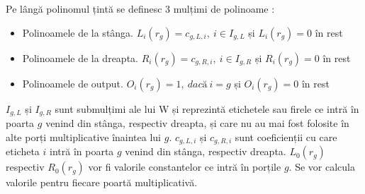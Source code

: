 Pe lângă polinomul țintă se definesc 3 mulțimi de polinoame \cite{ZKS_Crypto_Basic3}:
\begin{itemize}
    \item Polinoamele de la stânga. $L_i(r_g) = c_{g,L,i},\ i \in I_{g,L}$ și $L_i(r_g) = 0$ în rest
    \item Polinoamele de la dreapta. $R_i(r_g) = c_{g,R,i},\ i \in I_{g,R}$ și $R_i(r_g) = 0$ în rest
    \item Polinoamele de output. $O_i(r_g) = 1,\ dacă\ i = g$ și $O_i(r_g) = 0$ în rest
\end{itemize}

$I_{g,L}$ și $I_{g,R}$ sunt submulțimi ale lui W și reprezintă etichetele sau firele ce intră în poarta $g$ venind din stânga, respectiv dreapta, și care nu au mai fost folosite în alte porți multiplicative înaintea lui $g$.
$c_{g,L,i}$ și $c_{g,R,i}$ sunt coeficienții cu care eticheta $i$ intră în poarta $g$ venind din stânga, respectiv dreapta.
$L_0(r_g)$ respectiv $R_0(r_g)$ vor fi valorile constantelor ce intră în porțile $g$. 
Se vor calcula valorile pentru fiecare poartă multiplicativă.

